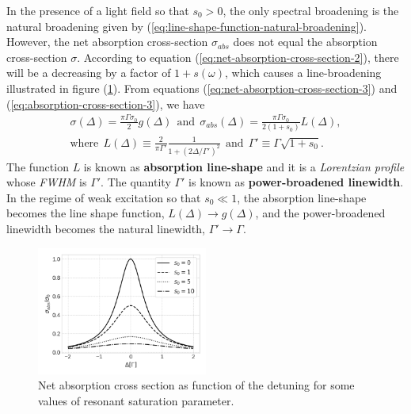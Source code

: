 {In the presence of a light field so that $ s_0 > 0 $, the only spectral broadening is the natural broadening given by (\ref{eq:line-shape-function-natural-broadening}). However, the net absorption cross-section $ \sigma_{abs} $ does not equal the absorption cross-section $ \sigma $. According to equation (\ref{eq:net-absorption-cross-section-2}), there will be a decreasing by a factor of $ 1 + s(\omega) $, which causes a line-broadening illustrated in figure (\ref{fig:net-absorption-cross-section}). From equations (\ref{eq:net-absorption-cross-section-3}) and (\ref{eq:absorption-cross-section-3}), we have
\begin{gather}
	\sigma(\Delta) = \frac{\pi \Gamma \sigma_0}{2} g(\Delta)\ \ \textrm{and}\ \ \sigma_{abs}(\Delta) = \frac{\pi \Gamma \sigma_0}{2(1 + s_0)} L(\Delta),
	\\
	\textrm{where}\ \ L(\Delta) \equiv \frac{2}{\pi \Gamma'} \frac{1}{1 + (2\Delta / \Gamma')^2}\ \ \textrm{and}\ \ \Gamma' \equiv \Gamma \sqrt{1 + s_0}.
	\label{eq:absorption-line-shape}
\end{gather}
The function $ L $ is known as \textbf{absorption line-shape} and it is a \textit{Lorentzian profile} whose \textit{FWHM} is $ \Gamma' $. The quantity $ \Gamma' $ is known as \textbf{power-broadened linewidth}. In the regime of weak excitation so that $ s_0 \ll 1 $, the absorption line-shape becomes the line shape function, $ L(\Delta) \rightarrow g(\Delta) $, and the power-broadened linewidth becomes the natural linewidth, $ \Gamma' \rightarrow \Gamma $.

\begin{figure}[!ht]
	\centering
	\includegraphics[width=0.5\textwidth]{USPSC-img/net_absorption_cross_section.png}
	\caption{Net absorption cross section as function of the detuning for some values of resonant saturation parameter.}
	\label{fig:net-absorption-cross-section}
\end{figure}

}
